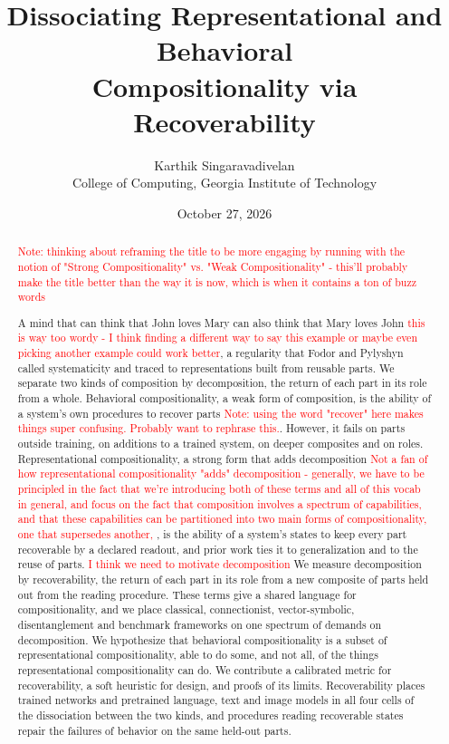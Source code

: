 \documentclass[10pt]{article}
\title{Dissociating Representational and Behavioral\\ Compositionality via Recoverability}
\author{Karthik Singaravadivelan\\ College of Computing, Georgia Institute of Technology}
\date{October 27, 2026}
\newcommand{\note}[1]{\textcolor{red}{#1}}
\theoremstyle{plain}
\theoremstyle{remark}
\begin{document}
\maketitle

\begin{abstract}
\note{Note: thinking about reframing the title to be more engaging by running with the notion of "Strong Compositionality" vs. "Weak Compositionality" - this'll probably make the title better than the way it is now, which is when it contains a ton of buzz words}

A mind that can think that John loves Mary can also think that Mary loves John \note{this is way too wordy - I think finding a different way to say this example or maybe even picking another example could work better}, a regularity that Fodor and Pylyshyn called systematicity and traced to representations built from reusable parts. We separate two kinds of composition by decomposition, the return of each part in its role from a whole. Behavioral compositionality, a weak form of composition, is the ability of a system's own procedures to recover parts \note{Note: using the word "recover" here makes things super confusing. Probably want to rephrase this.}. However, it fails on parts outside training, on additions to a trained system, on deeper composites and on roles. Representational compositionality, a strong form that adds decomposition \note{Not a fan of how representational compositionality "adds" decomposition - generally, we have to be principled in the fact that we're introducing both of these terms and all of this vocab in general, and focus on the fact that composition involves a spectrum of capabilities, and that these capabilities can be partitioned into two main forms of compositionality, one that supersedes another, }, is the ability of a system's states to keep every part recoverable by a declared readout, and prior work ties it to generalization and to the reuse of parts. \note{I think we need to motivate decomposition} We measure decomposition by recoverability, the return of each part in its role from a new composite of parts held out from the reading procedure. These terms give a shared language for compositionality, and we place classical, connectionist, vector-symbolic, disentanglement and benchmark frameworks on one spectrum of demands on decomposition. We hypothesize that behavioral compositionality is a subset of representational compositionality, able to do some, and not all, of the things representational compositionality can do. We contribute a calibrated metric for recoverability, a soft heuristic for design, and proofs of its limits. Recoverability places trained networks and pretrained language, text and image models in all four cells of the dissociation between the two kinds, and procedures reading recoverable states repair the failures of behavior on the same held-out parts.
\end{abstract}
\end{document}
